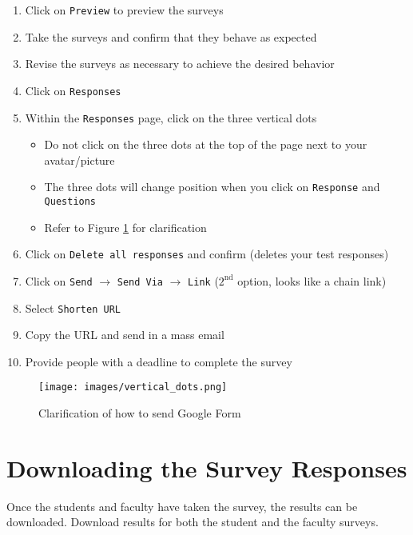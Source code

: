 \begin{enumerate}
	\item Click on \texttt{Preview} to preview the surveys
	\item Take the surveys and confirm that they behave as expected
	\item Revise the surveys as necessary to achieve the desired behavior
	\item Click on \texttt{Responses}
	\item Within the \texttt{Responses} page, click on the three vertical dots
		\begin{itemize}
			\item Do not click on the three dots at the top of the page next to your avatar/picture
			\item The three dots will change position when you click on \texttt{Response} and \texttt{Questions}
			\item Refer to Figure \ref{fig:vertical_dots} for clarification
		\end{itemize}
	\item Click on \texttt{Delete all responses} and confirm (deletes your test responses)
	\item Click on \texttt{Send} $\rightarrow$ \texttt{Send Via} $\rightarrow$ \texttt{Link} ($2^\text{nd}$ option, looks like a chain link)
	\item Select \texttt{Shorten URL}
	\item Copy the URL and send in a mass email
	\item Provide people with a deadline to complete the survey
\end{enumerate}

\begin{figure}
	\centering
	\texttt{[image: images/vertical\_dots.png]}
	\caption{\label{fig:vertical_dots} Clarification of how to send Google Form}
\end{figure}



%
%
\section{Downloading the Survey Responses}

Once the students and faculty have taken the survey, the results can be downloaded.  Download results for both the student and the faculty surveys.

